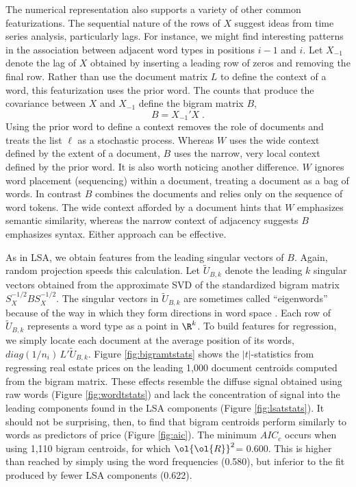 \documentclass[12pt]{article}
\newcommand{\prs}{\mbox{$\ol{\ol{R}}^2$}}
\begin{document}
The numerical representation  also supports a variety of other common featurizations.  The sequential nature of the rows of $X$ suggest ideas from time series analysis, particularly lags.  For instance, we might find interesting patterns in the association between adjacent word types in positions $i-1$ and $i$.  Let $X_{-1}$ denote the lag of $X$ obtained by inserting a leading row of zeros and removing the final row.  Rather than use the document matrix $L$ to define the context of a word, this featurization uses the prior word.  The counts that produce the covariance between $X$ and $X_{-1}$ define the bigram matrix $B$,
 \begin{equation}
   B = X_{-1}' X   \;.
\end{equation}
Using the prior word to define a context removes the role of documents and treats the list $\ell$ as a stochastic process.  Whereas $W$ uses the wide context defined by the extent of a document, $B$ uses the narrow, very local context defined by the prior word.  It is also worth noticing another difference.  $W$ ignores word placement (sequencing) within a document, treating a document as a bag of words.  In contrast $B$ combines the documents and relies only on the sequence of word tokens. The wide context afforded by a document hints that $W$ emphasizes semantic similarity, whereas the narrow context of adjacency suggests $B$ emphasizes syntax.  Either approach can be effective.

 
As in LSA, we obtain features from the leading singular vectors of $B$.  Again, random projection speeds this calculation.  Let $\widetilde{U}_{B,k}$ denote the leading $k$ singular vectors obtained from the approximate SVD of the standardized bigram matrix $S_X^{-1/2} B S_X^{-1/2}$.  The singular vectors in $\widetilde{U}_{B,k}$ are sometimes called ``eigenwords'' because of the way in which they form directions in word space .  Each row of $\widetilde{U}_{B,k}$ represents a word type as a point in $\R^k$.   To build features for regression, we simply locate each document at the average position of its words, $diag(1/n_i)\,L'\widetilde{U}_{B,k}$.
Figure \ref{fig:bigramtstats} shows the $|t|$-statistics from regressing real estate prices on the leading 1,000 document centroids computed from the bigram matrix.  These effects resemble the diffuse signal obtained using raw words (Figure \ref{fig:wordtstats}) and lack the concentration of signal into the leading components found in the LSA components (Figure \ref{fig:lsatstats}).  It should not be surprising, then, to find that bigram centroids perform similarly to words as predictors of price (Figure \ref{fig:aic}).  The minimum $AIC_c$ occurs when using 1,110 bigram centroids, for which \prs = 0.600.  This is higher than reached by simply using the word frequencies (0.580), but inferior to the fit produced by fewer LSA components (0.622).
\end{document}
